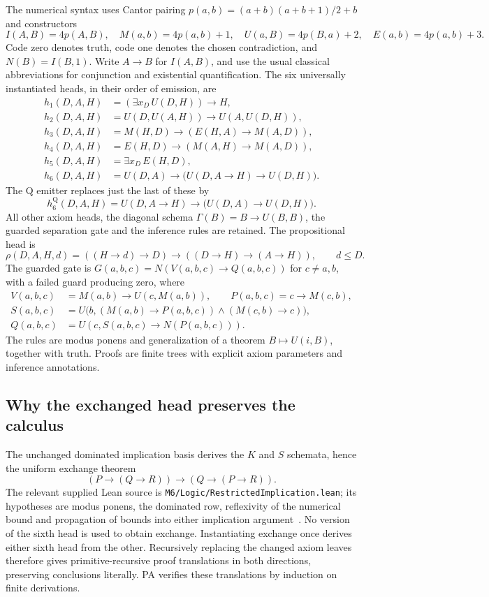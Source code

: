 \documentclass[11pt,letterpaper]{article}
\newcommand{\file}[1]{\nolinkurl{#1}}
\begin{document}
The numerical syntax uses Cantor pairing
$p(a,b)=(a+b)(a+b+1)/2+b$ and constructors
\[
 I(A,B)=4p(A,B),\quad M(a,b)=4p(a,b)+1,\quad
 U(a,B)=4p(B,a)+2,\quad E(a,b)=4p(a,b)+3.
\]
Code zero denotes truth, code one denotes the chosen contradiction, and
$N(B)=I(B,1)$. Write $A\to B$ for $I(A,B)$, and use the usual classical
abbreviations for conjunction and existential quantification. The six
universally instantiated heads, in their order of emission, are
\begin{align*}
 h_1(D,A,H)&=(\exists x_D\,U(D,H))\to H,\\
 h_2(D,A,H)&=U(D,U(A,H))\to U(A,U(D,H)),\\
 h_3(D,A,H)&=M(H,D)\to(E(H,A)\to M(A,D)),\\
 h_4(D,A,H)&=E(H,D)\to(M(A,H)\to M(A,D)),\\
 h_5(D,A,H)&=\exists x_D\,E(H,D),\\
 h_6(D,A,H)&=U(D,A)\to\bigl(U(D,A\to H)\to U(D,H)\bigr).
\end{align*}
The Q emitter replaces just the last of these by
\[
 h_6^{\mathrm Q}(D,A,H)
 =U(D,A\to H)\to\bigl(U(D,A)\to U(D,H)\bigr).
\]
All other axiom heads, the diagonal schema
$\Gamma(B)=B\to U(B,B)$, the guarded separation gate and the inference
rules are retained. The propositional head is
\[
 \rho(D,A,H,d)=((H\to d)\to D)\to((D\to H)\to(A\to H)),
 \qquad d\le D.
\]
The guarded gate is $G(a,b,c)=N(V(a,b,c)\to Q(a,b,c))$ for $c\ne a,b$,
with a failed guard producing zero, where
\begin{align*}
 V(a,b,c)&=M(a,b)\to U(c,M(a,b)),\qquad P(a,b,c)=c\to M(c,b),\\
 S(a,b,c)&=U\bigl(b,(M(a,b)\to P(a,b,c))\wedge(M(c,b)\to c)\bigr),\\
 Q(a,b,c)&=U(c,S(a,b,c)\to N(P(a,b,c))).
\end{align*}
The rules are modus ponens and generalization of a theorem
$B\mapsto U(i,B)$, together with truth. Proofs are finite trees with
explicit axiom parameters and inference annotations.

\subsection{Why the exchanged head preserves the calculus}

The unchanged dominated implication basis derives the $K$ and $S$
schemata, hence the uniform exchange theorem
\[
 (P\to(Q\to R))\to(Q\to(P\to R)).
\]
The relevant supplied Lean source is
\file{M6/Logic/RestrictedImplication.lean}; its hypotheses are modus ponens,
the dominated row, reflexivity of the numerical bound and propagation of
bounds into either implication argument~\cite{restricted}. No version of
the sixth head is used to obtain exchange. Instantiating exchange once
derives either sixth head from the other. Recursively replacing the
changed axiom leaves therefore gives primitive-recursive proof translations
in both directions, preserving conclusions literally. PA verifies these
translations by induction on finite derivations.
\end{document}
